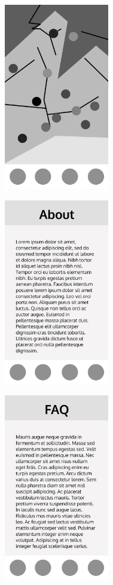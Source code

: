 \begin{figure}
    \centering
    \begin{subfigure}{0.33\textwidth}
        \centering
        \includegraphics[width=130pt]{../assets/images/low_homepage.png}
        \caption{}
        \label{fig:lowhome}
    \end{subfigure}%
    \begin{subfigure}{0.33\textwidth}
        \centering
        \includegraphics[width=130pt]{../assets/images/low_about.png}
        \caption{}
        \label{fig:lowabout}
    \end{subfigure}%
    \begin{subfigure}{0.33\textwidth}
        \centering
        \includegraphics[width=130pt]{../assets/images/low_more_info.png}

\end{subfigure}
\end{figure}
